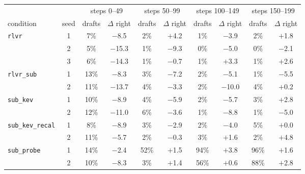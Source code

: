 \begin{tabular}{@{}lccccccccc@{}}
\toprule
 & & \multicolumn{2}{c}{steps 0--49} & \multicolumn{2}{c}{steps 50--99} & \multicolumn{2}{c}{steps 100--149} & \multicolumn{2}{c}{steps 150--199} \\ \cmidrule(l{2pt}r{2pt}){3-4}\cmidrule(l{2pt}r{2pt}){5-6}\cmidrule(l{2pt}r{2pt}){7-8}\cmidrule(l{2pt}r{2pt}){9-10}
condition & seed & drafts & $\Delta$ right & drafts & $\Delta$ right & drafts & $\Delta$ right & drafts & $\Delta$ right \\ \midrule
\texttt{rlvr} & 1 & 7\% & $-$8.5 & 2\% & $+$4.2 & 1\% & $-$3.9 & 2\% & $+$1.8 \\
 & 2 & 5\% & $-$15.3 & 1\% & $-$9.3 & 0\% & $-$5.0 & 0\% & $-$2.1 \\
 & 3 & 6\% & $-$14.3 & 1\% & $-$0.7 & 1\% & $+$3.3 & 1\% & $+$2.6 \\
\addlinespace
\texttt{rlvr\_sub} & 1 & 13\% & $-$8.3 & 3\% & $-$7.2 & 2\% & $-$5.1 & 1\% & $-$5.5 \\
 & 2 & 11\% & $-$13.7 & 4\% & $-$3.3 & 2\% & $-$10.0 & 4\% & $+$0.2 \\
\addlinespace
\texttt{sub\_kev} & 1 & 10\% & $-$8.9 & 4\% & $-$5.9 & 2\% & $-$5.7 & 3\% & $+$2.8 \\
 & 2 & 12\% & $-$11.0 & 6\% & $-$3.6 & 1\% & $-$8.8 & 1\% & $-$5.0 \\
\addlinespace
\texttt{sub\_kev\_recal} & 1 & 8\% & $-$8.9 & 3\% & $-$2.9 & 2\% & $-$4.0 & 5\% & $+$0.0 \\
 & 2 & 11\% & $-$5.7 & 2\% & $-$0.3 & 3\% & $+$1.6 & 2\% & $+$4.8 \\
\addlinespace
\texttt{sub\_probe} & 1 & 14\% & $-$2.4 & 52\% & $+$1.5 & 94\% & $+$3.8 & 96\% & $+$1.6 \\
 & 2 & 10\% & $-$8.3 & 3\% & $+$1.4 & 56\% & $+$0.6 & 88\% & $+$2.8 \\
\bottomrule
\end{tabular}

